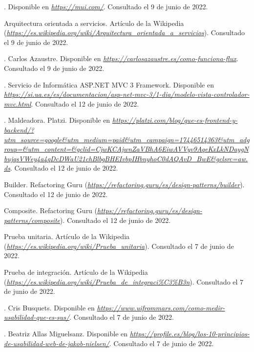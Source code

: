 \begin{thebibliography}{99}
. Disponible en {\it \url{https://mui.com/}}. Consultado el 9 de junio de 2022.

 Arquitectura orientada a servicios. Artículo de la Wikipedia ({\it \url{https://es.wikipedia.org/wiki/Arquitectura_orientada_a_servicios}}). Consultado el 9 de junio de 2022.

. Carlos Azaustre. Disponible en {\it \url{https://carlosazaustre.es/como-funciona-flux}}. Consultado el 9 de junio de 2022.

. Servicio de Informática ASP.NET MVC 3 Framework. Disponible en {\it \url{https://si.ua.es/es/documentacion/asp-net-mvc-3/1-dia/modelo-vista-controlador-mvc.html}}. Consultado el 12 de junio de 2022.

. Maldeadora. Platzi. Disponible en {\it \url{https://platzi.com/blog/que-es-frontend-y-backend/?utm_source=google&utm_medium=paid&utm_campaign=17446514363&utm_adgroup=&utm_content=&gclid=CjwKCAjwnZaVBhA6EiwAVVyv9AqeKxLkNDaygNbujqsVWey4a4qDcDWaU21chBlbgBHEIvbpIHbnyhoC0dAQAvD_BwE&gclsrc=aw.ds}}. Consultado el 12 de junio de 2022.

 Builder. Refactoring Guru ({\it \url{https://refactoring.guru/es/design-patterns/builder}}). Consultado el 12 de junio de 2022.

 Composite. Refactoring Guru ({\it \url{https://refactoring.guru/es/design-patterns/composite}}). Consultado el 12 de junio de 2022.

 Prueba unitaria. Artículo de la Wikipedia ({\it \url{https://es.wikipedia.org/wiki/Prueba_unitaria}}). Consultado el 7 de junio de 2022.

 Prueba de integración. Artículo de la Wikipedia ({\it \url{https://es.wikipedia.org/wiki/Prueba_de_integraci%C3%B3n}}). Consultado el 7 de junio de 2022.

. Cris Busquets. Disponible en {\it \url{https://www.uifrommars.com/como-medir-usabilidad-que-es-sus/}}. Consultado el 7 de junio de 2022.

. Beatriz Allas Miguelsanz. Disponible en {\it \url{https://profile.es/blog/los-10-principios-de-usabilidad-web-de-jakob-nielsen/}}. Consultado el 7 de junio de 2022.


\end{thebibliography}
